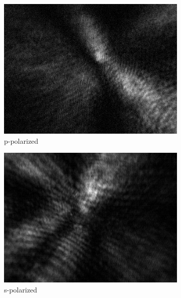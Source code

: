 \begin{figure}[!h]
\centering
  \begin{subfigure}[b]{0.2\textwidth}
    \includegraphics[width=\textwidth]{diffraction_image/2015040117594700004-1}
    \caption{p-polarized}
  \end{subfigure}
  \begin{subfigure}[b]{0.2\textwidth}
    \includegraphics[width=\textwidth]{diffraction_image/2015040117594700004-2}
    \caption{s-polarized}
  \end{subfigure}
  \begin{subfigure}[b]{0.2\textwidth}

\end{subfigure}
\end{figure}

